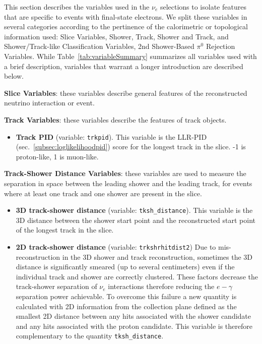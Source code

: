 \par This section describes the variables used in the $\nu_e$ selections to isolate features that are specific to events with final-state electrons. We split these variables in several categories according to the pertinence of the calorimetric or topological information used: Slice Variables, Shower, Track, Shower and Track, and Shower/Track-like  Classification Variables,  2nd Shower-Based $\pi^0$ Rejection Variables.  While Table~\ref{tab:variableSummary} summarizes all variables used with a brief description, variables that warrant a longer introduction are described below.

\par \noindent  \textbf{Slice Variables}: these variables describe general features of the reconstructed neutrino interaction or event.
\par \noindent  \textbf{Track Variables}: these variables describe the features of track objects.
\begin{itemize}
 \item[] \textbf{Track PID} (variable: \texttt{trkpid}).  This variable is the LLR-PID (sec.~\ref{subsec:loglikelihoodpid}) score for the longest track in the slice. -1 is proton-like, 1 is muon-like. 
 \end{itemize}
\par \noindent \textbf{Track-Shower Distance Variables}: these variables are used to measure the separation in space between the leading shower and the leading track, for events where at least one track and one shower are present in the slice. 
\begin{itemize}
 \item[] \textbf{3D track-shower distance} (variable: \texttt{tksh\_distance}).  This variable is the 3D distance between the shower start point and the reconstructed start point of the longest track in the slice. 
 \item[] \textbf{2D track-shower distance} (variable: \texttt{trkshrhitdist2}) Due to mis-reconstruction in the 3D shower and track reconstruction, sometimes the 3D distance is significantly smeared (up to several centimeters) even if the individual track and shower are correctly clustered. These factors decrease the track-shower separation of $\nu_e$ interactions therefore reducing the $e-\gamma$ separation power achievable. To overcome this failure a new quantity is calculated with 2D information from the collection plane defined as the smallest 2D distance between any hits associated with the shower candidate and any hits associated with the proton candidate. This variable is therefore complementary to the quantity \texttt{tksh\_distance}.
\end{itemize}



